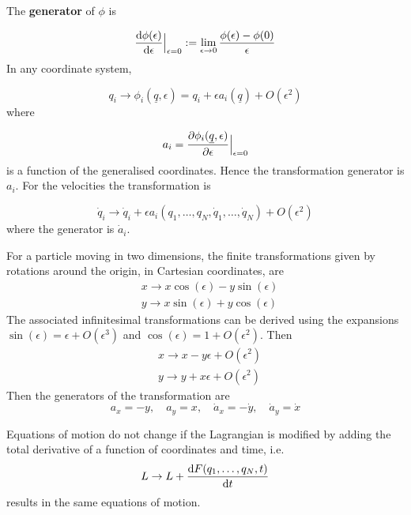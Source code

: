 \begin{definition}
	The \textbf{generator} of $\phi$ is

	\[ \diff{\phi(\epsilon)}{\epsilon} \Big|_{\epsilon = 0} := \lim_{\epsilon \rightarrow 0} \frac{\phi(\epsilon) - \phi(0)}{\epsilon} \]
	In any coordinate system,

	\[ q_i \rightarrow \phi_i(\underline{q}, \epsilon) = q_i + \epsilon a_i(\underline{q}) + O(\epsilon^2) \]
	where

	\[ a_i = \diffp{\phi_i(\underline{q}, \epsilon)}{\epsilon} \Big|_{\epsilon = 0} \]
	is a function of the generalised coordinates. Hence the transformation generator is $a_i$. For the velocities the transformation is

	\[ \dot{q}_i \rightarrow \dot{q}_i + \epsilon a_i(q_1, \dots, q_N, \dot{q}_1, \dots, \dot{q}_N) + O(\epsilon^2) \]
	where the generator is $\dot{a}_i$.
\end{definition}

\begin{example}
	For a particle moving in two dimensions, the finite transformations given by rotations around the origin, in Cartesian coordinates, are
	\[
		\begin{aligned}
			& x \rightarrow x \cos(\epsilon) - y \sin(\epsilon) \\
			& y \rightarrow x \sin(\epsilon) + y \cos(\epsilon)
		\end{aligned}
	\]
	The associated infinitesimal transformations can be derived using the expansions $\sin(\epsilon) = \epsilon + O(\epsilon^3)$ and $\cos(\epsilon) = 1 + O(\epsilon^2)$. Then
	\[
		\begin{aligned}
			& x \rightarrow x - y \epsilon + O(\epsilon^2) \\
			& y \rightarrow y + x \epsilon + O(\epsilon^2)
		\end{aligned}
	\]
	Then the generators of the transformation are
	\[
		a_x = -y, \quad a_y = x, \quad \dot{a}_x = -\dot{y}, \quad \dot{a}_y = \dot{x}
	\]
\end{example}

\begin{lemma}
	Equations of motion do not change if the Lagrangian is modified by adding the total derivative of a function of coordinates and time, i.e.
	\[
		L \rightarrow L + \diff{F(q_1, \dots, q_N, t)}{t}
	\]
	results in the same equations of motion.
\end{lemma}

